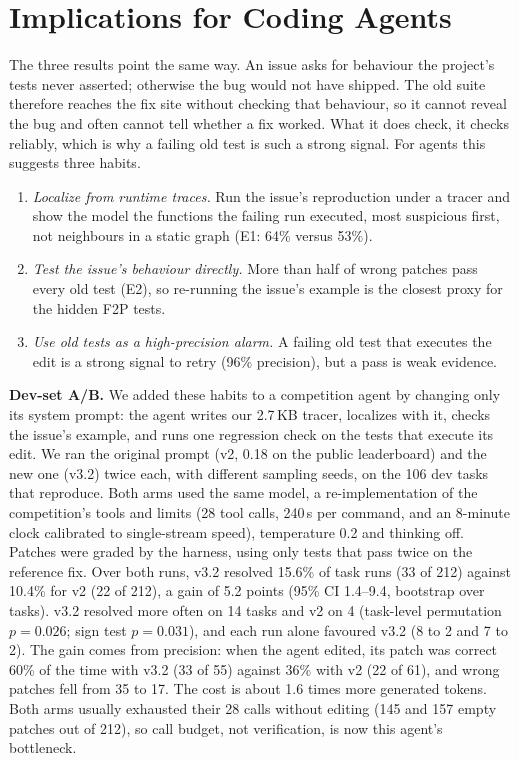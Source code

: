 \documentclass[conference]{IEEEtran}
\begin{document}
\section{Implications for Coding Agents}
The three results point the same way. An issue asks for behaviour the project's tests never asserted; otherwise the bug would not have shipped. The old suite therefore reaches the fix site without checking that behaviour, so it cannot reveal the bug and often cannot tell whether a fix worked. What it does check, it checks reliably, which is why a failing old test is such a strong signal. For agents this suggests three habits.
\begin{enumerate}
\item \emph{Localize from runtime traces.} Run the issue's reproduction under a tracer and show the model the functions the failing run executed, most suspicious first, not neighbours in a static graph (E1: 64\% versus 53\%).
\item \emph{Test the issue's behaviour directly.} More than half of wrong patches pass every old test (E2), so re-running the issue's example is the closest proxy for the hidden F2P tests.
\item \emph{Use old tests as a high-precision alarm.} A failing old test that executes the edit is a strong signal to retry (96\% precision), but a pass is weak evidence.
\end{enumerate}
\textbf{Dev-set A/B.} We added these habits to a competition agent by changing only its system prompt: the agent writes our 2.7\,KB tracer, localizes with it, checks the issue's example, and runs one regression check on the tests that execute its edit. We ran the original prompt (v2, 0.18 on the public leaderboard) and the new one (v3.2) twice each, with different sampling seeds, on the 106 dev tasks that reproduce. Both arms used the same model, a re-implementation of the competition's tools and limits (28 tool calls, 240\,s per command, and an 8-minute clock calibrated to single-stream speed), temperature 0.2 and thinking off. Patches were graded by the harness, using only tests that pass twice on the reference fix. Over both runs, v3.2 resolved 15.6\% of task runs (33 of 212) against 10.4\% for v2 (22 of 212), a gain of 5.2 points (95\% CI 1.4--9.4, bootstrap over tasks). v3.2 resolved more often on 14 tasks and v2 on 4 (task-level permutation $p=0.026$; sign test $p=0.031$), and each run alone favoured v3.2 (8 to 2 and 7 to 2). The gain comes from precision: when the agent edited, its patch was correct 60\% of the time with v3.2 (33 of 55) against 36\% with v2 (22 of 61), and wrong patches fell from 35 to 17. The cost is about 1.6 times more generated tokens. Both arms usually exhausted their 28 calls without editing (145 and 157 empty patches out of 212), so call budget, not verification, is now this agent's bottleneck.
\end{document}
